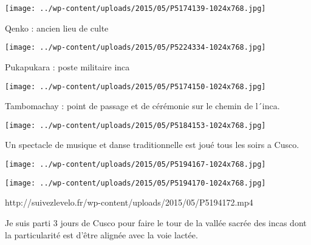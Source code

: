 \begin{center} \texttt{[image: ../wp-content/uploads/2015/05/P5174139-1024x768.jpg]} \end{center}

 

 Qenko : ancien lieu de culte 

 

\begin{center} \texttt{[image: ../wp-content/uploads/2015/05/P5224334-1024x768.jpg]} \end{center}

 

 Pukapukara : poste militaire inca 

 

\begin{center} \texttt{[image: ../wp-content/uploads/2015/05/P5174150-1024x768.jpg]} \end{center}

 

 Tambomachay : point de passage et de cérémonie sur le chemin de l´inca. 

 

\begin{center} \texttt{[image: ../wp-content/uploads/2015/05/P5184153-1024x768.jpg]} \end{center}

 

 Un spectacle de musique et danse traditionnelle est joué tous les soirs a Cusco. 

 

\begin{center} \texttt{[image: ../wp-content/uploads/2015/05/P5194167-1024x768.jpg]} \end{center}

 

 

\begin{center} \texttt{[image: ../wp-content/uploads/2015/05/P5194170-1024x768.jpg]} \end{center}

 

 

 http://suivezlevelo.fr/wp-content/uploads/2015/05/P5194172.mp4 

 Je suis parti 3 jours de Cusco pour faire le tour de la vallée sacrée des incas dont la particularité est d'être alignée avec la voie lactée. 

